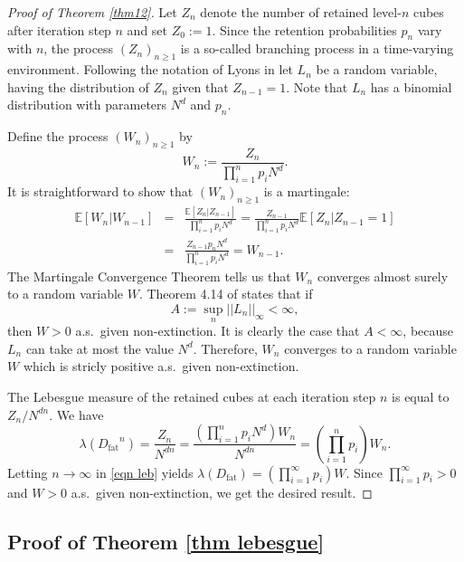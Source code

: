 \documentclass[11pt,a4paper]{article}
\newcommand{\IE}{\ensuremath{\mathbb{E}}}
\newcommand{\Dfat}{\ensuremath{D_{\text{fat}}}}
\theoremstyle{remark}
\begin{document}
\begin{proof}[Proof of Theorem \ref{thm12}]
Let $Z_n$ denote the number of retained level-$n$ cubes after iteration step $n$ and set $Z_0:=1$. Since the retention probabilities $p_n$ vary with $n$, the process $(Z_n)_{n \geq 1}$ is a so-called branching process in a time-varying environment. Following the notation of Lyons in \cite{Lyo} let $L_n$ be a random variable, having the distribution of $Z_n$ given that $Z_{n-1}=1$. Note that $L_n$ has a binomial distribution with parameters $N^{d}$ and $p_{n}$. 

Define the process $(W_n)_{n \geq 1}$ by
\[
 W_n := \frac{Z_n}{\prod_{i=1}^{n} p_i N^d}.                                                                                                                                                                                                                                                                                                                                             \]
It is straightforward to show that $(W_n)_{n \geq 1}$ is  a martingale:
\begin{eqnarray*}
 \IE[W_n | W_{n-1}] &=&\frac{\IE[Z_n | Z_{n-1}]}{\prod_{i=1}^{n} p_i N^d} = \frac{Z_{n-1}}{\prod_{i=1}^{n} p_i N^d} \IE[Z_n | Z_{n-1}=1] \\
&=& \frac{Z_{n-1} p_n N^d}{\prod_{i=1}^{n} p_i N^d} = W_{n-1}.
\end{eqnarray*}
The Martingale Convergence Theorem tells us that $W_n$ converges almost surely to a random variable $W$. Theorem 4.14 of \cite{Lyo} states that if
\[
 A:=\sup_{n} ||L_n ||_{\infty} < \infty,
\]
then $W>0$ a.s.\ given non-extinction. It is clearly the case that $A <\infty$, because $L_n$ can take at most the value $N^{d}$. Therefore, $W_n$ converges to a random variable $W$ which is stricly positive a.s.\ given non-extinction.

The Lebesgue measure of the retained cubes at each iteration step $n$ is equal to $Z_n / N^{dn}$. We have
\begin{equation}\label{eqn leb}
 \lambda(\Dfat^n) = \frac{Z_n}{N^{dn}} = \frac{\left(\prod_{i=1}^{n} p_i N^d \right) W_n}{N^{dn}} = \left(\prod_{i=1}^{n} p_i \right) W_n.
\end{equation}
 Letting $n\to \infty$ in \eqref{eqn leb} yields $\lambda(\Dfat)= (\prod_{i=1}^{\infty}p_i) W$. Since $\prod_{i=1}^{\infty} p_i >0$ and $W>0$ a.s.\ given non-extinction, we get the desired result. 
\end{proof}


\subsection{Proof of Theorem \ref{thm lebesgue}}
\end{document}
